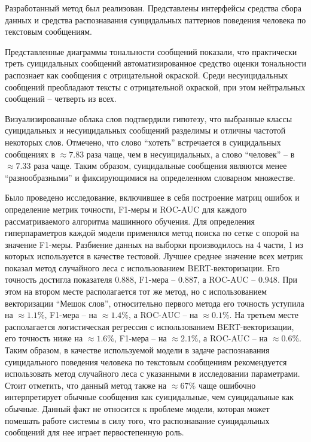 Разработанный метод был реализован. Представлены интерфейсы средства сбора данных и средства распознавания суицидальных паттернов поведения человека по текстовым сообщениям.

Представленные диаграммы тональности сообщений показали, что практически треть суицидальных сообщений автоматизированное средство оценки тональности распознает как сообщения с отрицательной окраской. 
Среди несуицидальных сообщений преобладают тексты с отрицательной окраской, при этом нейтральных сообщений -- четверть из всех.

Визуализированные облака слов подтвердили гипотезу, что выбранные классы суицидальных и несуицидальных сообщений разделимы и отличны частотой некоторых слов. 
Отмечено, что слово ``хотеть'' встречается в суицидальных сообщениях в $\approx 7.83$ раза чаще, чем в несуицидальных, а слово ``человек'' -- в $\approx 7.33$ раза чаще. 
Таким образом, суицидальные сообщения являются менее ``разнообразными'' и фиксирующимися на определенном словарном множестве.

Было проведено исследование, включившее в себя построение матриц ошибок и определение метрик точности, F1-меры и ROC-AUC для каждого рассматриваемого алгоритма машинного обучения.
Для определения гиперпараметров каждой модели применялся метод поиска по сетке с опорой на значение F1-меры. Разбиение данных на выборки производилось на 4 части, 1 из которых используется в качестве тестовой.
Лучшее среднее значение всех метрик показал метод случайного леса с использованием BERT-векторизации.
Его точность достигла показателя $0.888$, F1-мера -- $0.887$, а ROC-AUC -- $0.948$.
При этом на втором месте располагается тот же метод, но с использованием векторизации ``Мешок слов'', относительно первого метода его точность уступила на $\approx 1.1\%$, F1-мера -- на $\approx 1.4\%$, а ROC-AUC -- на $\approx 0.1\%$. 
На третьем месте располагается логистическая регрессия с использованием BERT-векторизации, его точность ниже на $\approx 1.6\%$, F1-мера -- на $\approx 2.1\%$, а ROC-AUC -- на $\approx 0.6\%$. 
Таким образом, в качестве используемой модели в задаче распознавания суицидального поведения человека по текстовым сообщениям рекомендуется использовать метод случайного леса с указанными в исследовании параметрами.
Стоит отметить, что данный метод также на $\approx 67\%$ чаще ошибочно интерпретирует обычные сообщения как суицидальные, чем суицидальные как обычные. Данный факт не относится к проблеме модели, которая может помешать работе системы в силу того, что распознавание суицидальных сообщений для нее играет первостепенную роль.

\pagebreak